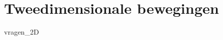\documentclass[12pt,a4paper]{article}
\begin{document}







\section{Tweedimensionale bewegingen}
{vragen_2D}
\end{document}
